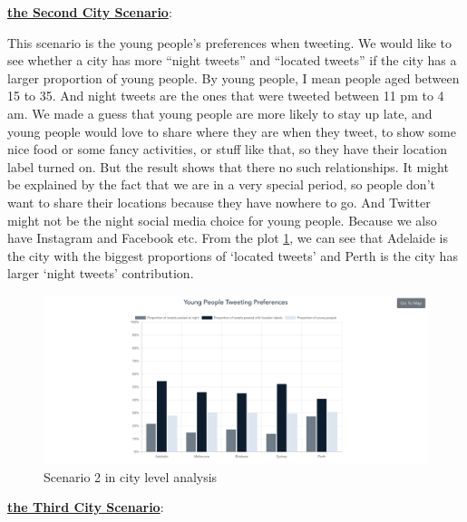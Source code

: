 \documentclass{article}
\begin{document}
\textbf{\underline{the Second City Scenario}}: 

This scenario is the young people's preferences when tweeting. We would like to see whether a city has more “night tweets” and “located tweets” if the city has a larger proportion of young people. By young people, I mean people aged between 15 to 35. And night tweets are the ones that were tweeted between 11 pm to 4 am. We made a guess that young people are more likely to stay up late, and young people would love to share where they are when they tweet, to show some nice food or some fancy activities, or stuff like that, so they have their location label turned on. But the result shows that there no such relationships. It might be explained by the fact that we are in a very special period, so people don’t want to share their locations because they have nowhere to go. And Twitter might not be the night social media choice for young people. Because we also have Instagram and Facebook etc. From the plot
\ref{fig:Young_people_tweeting_preference}, we can see that Adelaide is the city with the biggest proportions of ‘located tweets’ and Perth is the city has larger ‘night tweets’ contribution.
\begin{figure}[htp]
\centering
\includegraphics[width=\textwidth]{img/Young_people_tweeting_preference.png}
\caption{Scenario 2 in city level analysis}
\label{fig:Young_people_tweeting_preference}
\end{figure} 

\textbf{\underline{the Third City Scenario}}: 
\end{document}
